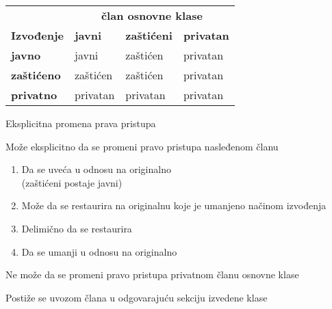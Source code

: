 \documentclass{article}
\newenvironment{xitemize}{%
    
    \itemize
    \larger
}{%
    \enditemize
}
\let\olditemize\itemize
\let\endolditemize\enditemize
\renewenvironment{itemize}{%
    \smaller
    \olditemize
}{%
    \endolditemize
}
\begin{document}
\begin{xitemize}
\begin{multicols}{2}
\begin{itemize}
\end{itemize}
\columnbreak
\end{multicols}
\begin{table}[h]
    \centering
    \begin{tabular}{|l|lll}
    \hline
    \multicolumn{1}{|c|}{}                                     & \multicolumn{3}{c|}{\textbf{član osnovne klase}}                                                                       \\ \cline{2-4} 
    \multicolumn{1}{|c|}{\multirow{-2}{*}{\textbf{Izvođenje}}} & \multicolumn{1}{l|}{\textbf{javni}} & \multicolumn{1}{l|}{\textbf{zaštićeni}} & \multicolumn{1}{l|}{\textbf{privatan}} \\ \hline
    \textbf{javno}                                             & \cellcolor[HTML]{DAE8FC}javni       & \cellcolor[HTML]{DAE8FC}zaštićen        & \cellcolor[HTML]{DAE8FC}privatan       \\ \cline{1-1}
    \textbf{zaštićeno}                                         & \cellcolor[HTML]{DAE8FC}zaštićen    & \cellcolor[HTML]{DAE8FC}zaštićen        & \cellcolor[HTML]{DAE8FC}privatan       \\ \cline{1-1}
    \textbf{privatno}                                          & \cellcolor[HTML]{DAE8FC}privatan    & \cellcolor[HTML]{DAE8FC}privatan        & \cellcolor[HTML]{DAE8FC}privatan       \\ \cline{1-1}
    \end{tabular}
    \end{table}
\item Eksplicitna promena prava pristupa
\begin{itemize}
    \item Može eksplicitno da se promeni pravo pristupa nasleđenom članu
    \begin{enumerate}
        \item Da se uveća u odnosu na originalno\\
        (zaštićeni postaje javni)
        \item Može da se restaurira na originalnu koje je umanjeno načinom izvođenja
        \item Delimično da se restaurira
        \item Da se umanji u odnosu na originalno
    \end{enumerate}
    \item Ne može da se promeni pravo pristupa privatnom članu osnovne klase
    \item Postiže se uvozom člana u odgovarajuću sekciju izvedene klase\\

\end{itemize}
\end{xitemize}
\end{document}
